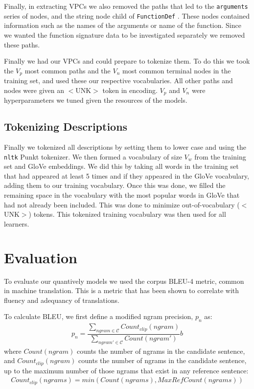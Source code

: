 Finally, in extracting VPCs we also removed the paths that led to the \texttt{arguments} series of nodes, and the string node child of \texttt{FunctionDef} . These nodes contained information such as the names of the arguments or name of the function. Since we wanted the function signature data to be investigated separately we removed these paths. 

Finally we had our VPCs and could prepare to tokenize them. To do this we took the $V_p$ most common paths and the $V_n$ most common terminal nodes in the training set, and used these our respective vocabularies.  All other paths and nodes were given an $<$UNK$>$ token in encoding. $V_p$ and $V_n$ were hyperparameters we tuned given the resources of the models.

\subsection{Tokenizing Descriptions}
\label{sub:tokenize_descriptions}

Finally we tokenized all descriptions by setting them to lower case and using the \texttt{nltk} \cite{bird_natural_2009} Punkt \cite{Kiss:2006:UMS:1245119.1245122}tokenizer. We then formed a vocabulary of size $V_w$ from the training set and GloVe embeddings. We did this by taking all words in the training set that had appeared at least 5 times and if they appeared in the GloVe vocabulary, adding them to our training vocabulary. Once this was done, we filled the remaining space in the vocabulary with the most popular words in GloVe that had not already been included. This was done to minimize out-of-vocabulary ($<$UNK$>$) tokens. This tokenized training vocabulary was then used for all learners.

\section{Evaluation}

To evaluate our quantively models we used the corpus BLEU-4 metric\cite{papineni_bleu_2001}, common in machine translation. This is a metric that has been shown to correlate with fluency and adequancy of translations. 

To calculate BLEU, we first define a modified ngram precision, $p_n$ as:
\begin{align}
    p_n = \dfrac{\sum_{ngram \in \mathcal{C}} Count_{clip}(ngram)}{\sum_{ngram' \in \mathcal{C}} Count(ngram')} \nonumber b
\end{align}
where $Count(ngram)$ counts the number of ngrams in the candidate sentence, and  $Count_{clip}(ngram)$ counts the number of ngrams in the candidate sentence, up to the maximum number of those ngrams that exist in any reference sentence:
\begin{align}
Count_{clip}(ngrams) = min(Count(ngrams),MaxRefCount(ngrams)) \nonumber
\end{align}

